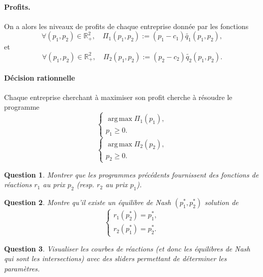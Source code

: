 \documentclass[11pt]{article}
\DeclareMathOperator*{\argmax}{arg\,max}
\newtheorem{question}{Question}
\begin{document}
\paragraph{Profits.}On a alors les niveaux de profits de chaque entreprise donnée par les fonctions
\begin{equation} \label{eq:6}
    \forall (p_1, p_2)\in \mathbb{R}_+^2,\quad\Pi_1(p_1, p_2):= (p_1 - c_1) \tilde{q_1}(p_1, p_2),
\end{equation}
et
\begin{equation} \label{eq:7}
    \forall (p_1, p_2)\in \mathbb{R}_+^2,\quad\Pi_2(p_1, p_2):= (p_2 - c_2) \tilde{q_2}(p_1, p_2).
\end{equation}
\paragraph{Décision rationnelle} Chaque entreprise cherchant à maximiser son profit cherche à résoudre le programme 
\begin{equation} \label{eq:4}
    \begin{cases}
        \argmax \Pi_1(p_1),\\
        p_1\geq 0.
    \end{cases}
\end{equation}
\begin{equation} \label{eq:5}
    \begin{cases}
        \argmax \Pi_2(p_2),\\
        p_2\geq 0.
    \end{cases}
\end{equation}

\begin{question}
    Montrer que les programmes précédents fournissent des fonctions de réactions $r_1$ au prix $p_2$ (resp. $r_2$ au prix $p_1$).
\end{question}

\begin{question}
    Montre qu'il existe un équilibre de Nash $(p^*_1, p^*_2)$  solution de 
    \begin{equation} \label{eq:8}
        \begin{cases}
            r_1(p^*_2)=p^*_1,\\
            r_2(p^*_1)=p^*_2.
        \end{cases}
    \end{equation}
\end{question}

\begin{question}
    Visualiser les courbes de réactions (et donc les équilibres de Nash qui sont les intersections) avec des sliders permettant de déterminer les paramètres.
\end{question}
\end{document}
